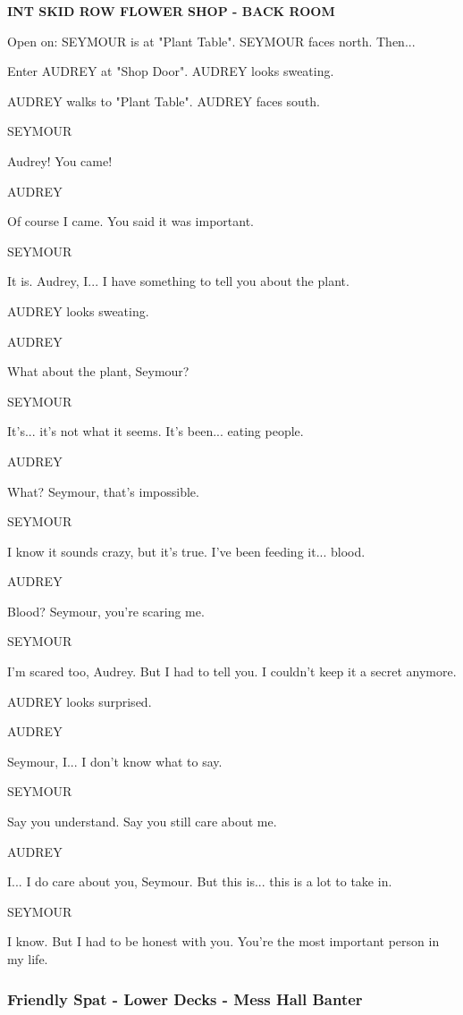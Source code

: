 \documentclass[11pt,letterpaper,oldstylefigures]{memoir}
\newcommand{\slugline}[1]{\nobreak\textbf{\MakeUppercase{#1}}\par\nobreak\vspace{1\baselineskip}}
\newcommand{\speaker}[1]{\nobreak\hspace*{0.333\textwidth}\MakeUppercase{#1}\par\nobreak\vspace{0.5\baselineskip}}
\newcommand{\dialogue}[1]{\nobreak\hspace*{0.25\textwidth}\begin{minipage}{0.5\textwidth}#1\end{minipage}\par\vspace{1\baselineskip}}
\newcommand{\stagedir}[1]{#1\par\vspace{1\baselineskip}}
\newenvironment{FountainExample}
  {\begingroup
  \ttfamily\small
   \setlength{\parindent}{0pt}
  \setlength{\parskip}{0.5em}
  \allowdisplaybreaks
  \setlength{\displaywidowpenalty}{0}
  \setlength{\widowpenalty}{0}
  \setlength{\clubpenalty}{0}
  \setlength{\interlinepenalty}{0}
}
  {\endgroup}
\begin{document}
\begin{FountainExample}
\slugline{INT SKID ROW FLOWER SHOP - BACK ROOM}

\stagedir{Open on: SEYMOUR is at "Plant Table". SEYMOUR faces north. Then...}
\stagedir{Enter AUDREY at "Shop Door". AUDREY looks sweating.}
\stagedir{AUDREY walks to "Plant Table". AUDREY faces south.}

\speaker{SEYMOUR}
\dialogue{Audrey! You came!}

\speaker{AUDREY}
\dialogue{Of course I came. You said it was important.}

\speaker{SEYMOUR}
\dialogue{It is. Audrey, I... I have something to tell you about the plant.}

\stagedir{AUDREY looks sweating.}
\speaker{AUDREY}
\dialogue{What about the plant, Seymour?}

\speaker{SEYMOUR}
\dialogue{It's... it's not what it seems. It's been... eating people.}

\speaker{AUDREY}
\dialogue{What? Seymour, that's impossible.}

\speaker{SEYMOUR}
\dialogue{I know it sounds crazy, but it's true. I've been feeding it... blood.}

\speaker{AUDREY}
\dialogue{Blood? Seymour, you're scaring me.}

\speaker{SEYMOUR}
\dialogue{I'm scared too, Audrey. But I had to tell you. I couldn't keep it a secret anymore.}

\stagedir{AUDREY looks surprised.}

\speaker{AUDREY}
\dialogue{Seymour, I... I don't know what to say.}

\speaker{SEYMOUR}
\dialogue{Say you understand. Say you still care about me.}

\speaker{AUDREY}
\dialogue{I... I do care about you, Seymour. But this is... this is a lot to take in.}

\speaker{SEYMOUR}
\dialogue{I know. But I had to be honest with you. You're the most important person in my life.}
\end{FountainExample}

\subsubsection*{Friendly Spat - Lower Decks - Mess Hall Banter}
\label{ex:friendly-spat-lower-decks}
\end{document}
